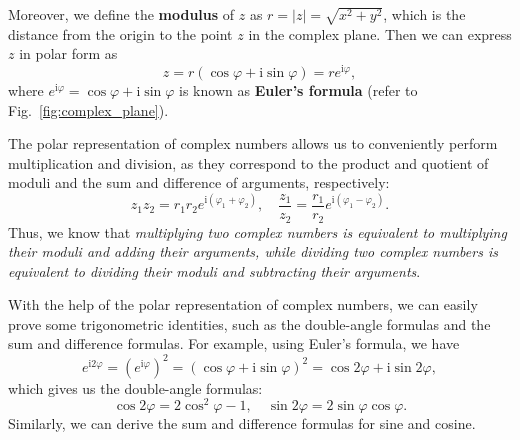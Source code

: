 Moreover, we define the \textbf{modulus} of \(z\) as \(r = |z| = \sqrt{x^2 + y^2}\), 
which is the distance from the origin to the point \(z\) in the complex plane.
Then we can express \(z\) in polar form as
\[
    z = r(\cos \varphi + \mathrm{i} \sin \varphi) = r e^{\mathrm{i} \varphi},
\]
where \(e^{\mathrm{i} \varphi} = \cos \varphi + \mathrm{i} \sin \varphi\) is known as \textbf{Euler's formula}
(refer to Fig.~\ref{fig:complex_plane}).

The polar representation of complex numbers allows us to conveniently perform multiplication and division,
as they correspond to the product and quotient of moduli and the sum and difference of arguments, respectively:
\[
    z_1 z_2 = r_1 r_2 e^{\mathrm{i} (\varphi_1 + \varphi_2)}, \quad
    \frac{z_1}{z_2} = \frac{r_1}{r_2} e^{\mathrm{i} (\varphi_1 - \varphi_2)}.
\]
Thus, we know that \emph{multiplying two complex numbers is equivalent to multiplying their moduli and adding their arguments, 
while dividing two complex numbers is equivalent to dividing their moduli and subtracting their arguments}.

\begin{remark}
    With the help of the polar representation of complex numbers, we can easily prove some trigonometric identities,
    such as the double-angle formulas and the sum and difference formulas.
    For example, using Euler's formula, we have
    \[
        e^{\mathrm{i} 2\varphi} = (e^{\mathrm{i} \varphi})^2 = (\cos \varphi + \mathrm{i} \sin \varphi)^2 = \cos 2\varphi + \mathrm{i} \sin 2\varphi,
    \]
    which gives us the double-angle formulas:
    \[
        \cos 2\varphi = 2\cos^2 \varphi - 1, \quad
        \sin 2\varphi = 2\sin \varphi \cos \varphi.
    \]
    Similarly, we can derive the sum and difference formulas for sine and cosine.
\end{remark}

